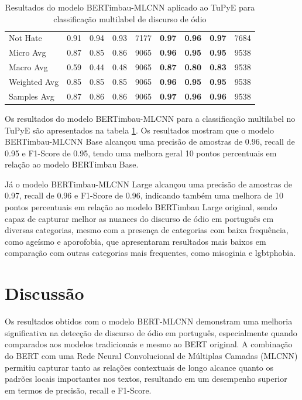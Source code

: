 \documentclass[sigconf,nonacm]{acmart}
\begin{document}
\begin{table}[H]
{\begin{tabular}{lcccccccc}
              Not Hate & 0.91 & 0.94 & 0.93 & 7177 & \textbf{0.97} & \textbf{0.96} & \textbf{0.97} & 7684 \\
              Micro Avg & 0.87 & 0.85 & 0.86 & 9065 & \textbf{0.96} & \textbf{0.95} & \textbf{0.95} & 9538 \\
              Macro Avg & 0.59 & 0.44 & 0.48 & 9065 & \textbf{0.87} & \textbf{0.80} & \textbf{0.83} & 9538 \\
              Weighted Avg & 0.85 & 0.85 & 0.85 & 9065 & \textbf{0.96} & \textbf{0.95} & \textbf{0.95} & 9538 \\
              Samples Avg & 0.87 & 0.86 & 0.86 & 9065 & \textbf{0.97} & \textbf{0.96} & \textbf{0.96} & 9538 \\
      \bottomrule
    \end{tabular}
  }
  \caption{Resultados do modelo BERTimbau-MLCNN aplicado ao TuPyE para classificação multilabel de discurso de ódio}
  \label{tab:comparison_metrics_tupye}
\end{table}

Os resultados do modelo BERTimbau-MLCNN para a classificação multilabel no TuPyE são apresentados na tabela \ref{tab:comparison_metrics_tupye}. 
Os resultados mostram que o modelo BERTimbau-MLCNN Base alcançou uma precisão de amostras de 0.96, recall de 0.95 e F1-Score de 0.95, 
tendo uma melhora geral 10 pontos percentuais em relação ao modelo BERTimbau Base. 

Já o modelo BERTimbau-MLCNN Large alcançou uma precisão de amostras de 0.97, recall de 0.96 e F1-Score de 0.96, 
indicando também uma melhora de 10 pontos percentuais em relação ao modelo BERTimbau Large original, sendo capaz de capturar melhor as nuances do discurso de ódio em português em diversas categorias, 
mesmo com a presença de categorias com baixa frequência, como ageísmo e aporofobia, que apresentaram resultados mais baixos em comparação com outras categorias mais frequentes, como misoginia e lgbtphobia.

\section{Discussão}
Os resultados obtidos com o modelo BERT-MLCNN demonstram uma melhoria significativa na detecção de discurso de ódio em português,
especialmente quando comparados aos modelos tradicionais e mesmo ao BERT original.
A combinação do BERT com uma Rede Neural Convolucional de Múltiplas Camadas (MLCNN) permitiu capturar tanto as relações contextuais de longo alcance quanto os padrões locais importantes nos textos, 
resultando em um desempenho superior em termos de precisão, recall e F1-Score.
\end{document}

